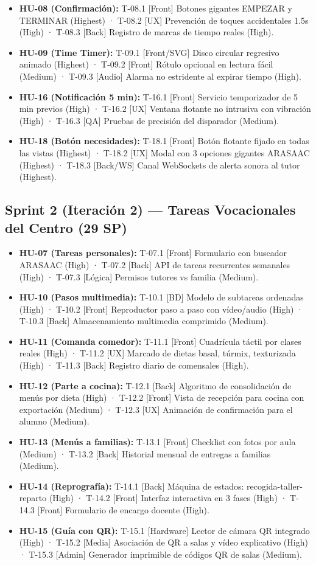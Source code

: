 \documentclass[11pt,a4paper]{article}
\begin{document}
\begin{itemize}
\item \textbf{HU-08 (Confirmación):} T-08.1 [Front] Botones gigantes EMPEZAR y TERMINAR (Highest) · T-08.2 [UX] Prevención de toques accidentales 1.5s (High) · T-08.3 [Back] Registro de marcas de tiempo reales (High).
\item \textbf{HU-09 (Time Timer):} T-09.1 [Front/SVG] Disco circular regresivo animado (Highest) · T-09.2 [Front] Rótulo opcional en lectura fácil (Medium) · T-09.3 [Audio] Alarma no estridente al expirar tiempo (High).
\item \textbf{HU-16 (Notificación 5 min):} T-16.1 [Front] Servicio temporizador de 5 min previos (High) · T-16.2 [UX] Ventana flotante no intrusiva con vibración (High) · T-16.3 [QA] Pruebas de precisión del disparador (Medium).
\item \textbf{HU-18 (Botón necesidades):} T-18.1 [Front] Botón flotante fijado en todas las vistas (Highest) · T-18.2 [UX] Modal con 3 opciones gigantes ARASAAC (Highest) · T-18.3 [Back/WS] Canal WebSockets de alerta sonora al tutor (Highest).
\end{itemize}

\subsection{Sprint 2 (Iteración 2) — Tareas Vocacionales del Centro (29 SP)}
\begin{itemize}
\item \textbf{HU-07 (Tareas personales):} T-07.1 [Front] Formulario con buscador ARASAAC (High) · T-07.2 [Back] API de tareas recurrentes semanales (High) · T-07.3 [Lógica] Permisos tutores vs familia (Medium).
\item \textbf{HU-10 (Pasos multimedia):} T-10.1 [BD] Modelo de subtareas ordenadas (High) · T-10.2 [Front] Reproductor paso a paso con vídeo/audio (High) · T-10.3 [Back] Almacenamiento multimedia comprimido (Medium).
\item \textbf{HU-11 (Comanda comedor):} T-11.1 [Front] Cuadrícula táctil por clases reales (High) · T-11.2 [UX] Marcado de dietas basal, túrmix, texturizada (High) · T-11.3 [Back] Registro diario de comensales (High).
\item \textbf{HU-12 (Parte a cocina):} T-12.1 [Back] Algoritmo de consolidación de menús por dieta (High) · T-12.2 [Front] Vista de recepción para cocina con exportación (Medium) · T-12.3 [UX] Animación de confirmación para el alumno (Medium).
\item \textbf{HU-13 (Menús a familias):} T-13.1 [Front] Checklist con fotos por aula (Medium) · T-13.2 [Back] Historial mensual de entregas a familias (Medium).
\item \textbf{HU-14 (Reprografía):} T-14.1 [Back] Máquina de estados: recogida-taller-reparto (High) · T-14.2 [Front] Interfaz interactiva en 3 fases (High) · T-14.3 [Front] Formulario de encargo docente (High).
\item \textbf{HU-15 (Guía con QR):} T-15.1 [Hardware] Lector de cámara QR integrado (High) · T-15.2 [Media] Asociación de QR a salas y vídeo explicativo (High) · T-15.3 [Admin] Generador imprimible de códigos QR de salas (Medium).
\end{itemize}
\end{document}
